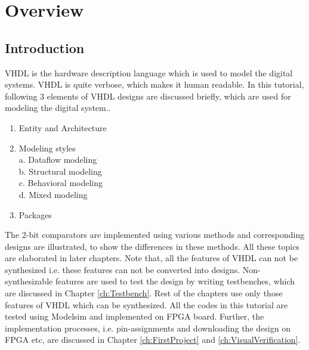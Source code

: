 \chapter{Overview} \label{ch:OverView}


\graphicspath{{Chapters/Overview/Figures/}}


%
%
%

\section{Introduction}
VHDL is the hardware description language which is used to model the digital systems. VHDL is quite verbose, which makes it human readable. In this tutorial, following 3 elements of VHDL designs are discussed briefly, which are used for modeling the digital system.. 
\begin{enumerate}
	\item Entity and Architecture
	\item Modeling styles\\
	a. Dataflow modeling\\
	b. Structural modeling\\
	c. Behavioral modeling\\
	d. Mixed modeling
	\item Packages
\end{enumerate}

The 2-bit comparators are implemented using various methods and corresponding designs are illustrated, to show the differences in these methods. All these topics are elaborated in later chapters. Note that, all the features of VHDL can not be synthesized i.e. these features can not be converted into designs. Non-synthesizable features are used to test the design by writing testbenches, which are discussed in Chapter \ref{ch:Testbench}. Rest of the chapters use only those features of VHDL which can be synthesized. All the codes in this tutorial are tested using Modelsim and implemented on FPGA board. Further, the implementation processes, i.e. pin-assignments and downloading the design on FPGA etc, are discussed in Chapter \ref{ch:FirstProject} and \ref{ch:VisualVerification}.

